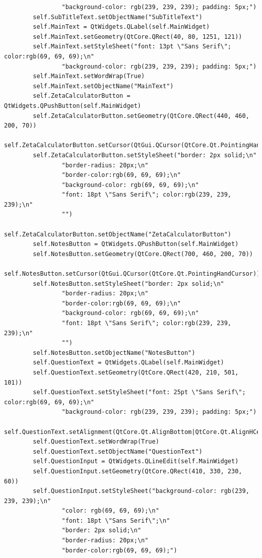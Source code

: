 \documentclass[12pt]{article}
\begin{document}
\begin{lstlisting}
                "background-color: rgb(239, 239, 239); padding: 5px;")
        self.SubTitleText.setObjectName("SubTitleText")
        self.MainText = QtWidgets.QLabel(self.MainWidget)
        self.MainText.setGeometry(QtCore.QRect(40, 80, 1251, 121))
        self.MainText.setStyleSheet("font: 13pt \"Sans Serif\"; color:rgb(69, 69, 69);\n"
                "background-color: rgb(239, 239, 239); padding: 5px;")
        self.MainText.setWordWrap(True)
        self.MainText.setObjectName("MainText")
        self.ZetaCalculatorButton = QtWidgets.QPushButton(self.MainWidget)
        self.ZetaCalculatorButton.setGeometry(QtCore.QRect(440, 460, 200, 70))
        self.ZetaCalculatorButton.setCursor(QtGui.QCursor(QtCore.Qt.PointingHandCursor))
        self.ZetaCalculatorButton.setStyleSheet("border: 2px solid;\n"
                "border-radius: 20px;\n"
                "border-color:rgb(69, 69, 69);\n"
                "background-color: rgb(69, 69, 69);\n"
                "font: 18pt \"Sans Serif\"; color:rgb(239, 239, 239);\n"
                "")
        self.ZetaCalculatorButton.setObjectName("ZetaCalculatorButton")
        self.NotesButton = QtWidgets.QPushButton(self.MainWidget)
        self.NotesButton.setGeometry(QtCore.QRect(700, 460, 200, 70))
        self.NotesButton.setCursor(QtGui.QCursor(QtCore.Qt.PointingHandCursor))
        self.NotesButton.setStyleSheet("border: 2px solid;\n"
                "border-radius: 20px;\n"
                "border-color:rgb(69, 69, 69);\n"
                "background-color: rgb(69, 69, 69);\n"
                "font: 18pt \"Sans Serif\"; color:rgb(239, 239, 239);\n"
                "")
        self.NotesButton.setObjectName("NotesButton")
        self.QuestionText = QtWidgets.QLabel(self.MainWidget)
        self.QuestionText.setGeometry(QtCore.QRect(420, 210, 501, 101))
        self.QuestionText.setStyleSheet("font: 25pt \"Sans Serif\"; color:rgb(69, 69, 69);\n"
                "background-color: rgb(239, 239, 239); padding: 5px;")
        self.QuestionText.setAlignment(QtCore.Qt.AlignBottom|QtCore.Qt.AlignHCenter)
        self.QuestionText.setWordWrap(True)
        self.QuestionText.setObjectName("QuestionText")
        self.QuestionInput = QtWidgets.QLineEdit(self.MainWidget)
        self.QuestionInput.setGeometry(QtCore.QRect(410, 330, 230, 60))
        self.QuestionInput.setStyleSheet("background-color: rgb(239, 239, 239);\n"
                "color: rgb(69, 69, 69);\n"
                "font: 18pt \"Sans Serif\";\n"
                "border: 2px solid;\n"
                "border-radius: 20px;\n"
                "border-color:rgb(69, 69, 69);")

\end{lstlisting}
\end{document}
